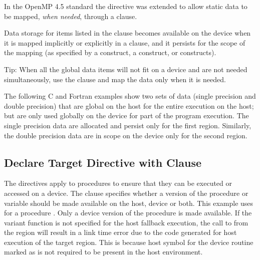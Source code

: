 
In the OpenMP 4.5 standard the  directive was extended to allow static
data to be mapped, \emph{when needed}, through a  clause.

Data storage for items listed in the  clause becomes available on the device
when it is mapped implicitly or explicitly in a  clause, and it persists for the scope of
the mapping (as specified by a  construct, 
a  construct, or 
 constructs).

Tip: When all the global data items will not fit on a device and are not needed
simultaneously, use the  clause and map the data only when it is needed.

The following C and Fortran examples show two sets of data (single precision and double precision)
that are global on the host for the entire execution on the host; but are only used
globally on the device for part of the program execution. The single precision data
are allocated and persist only for the first  region. Similarly, the
double precision data are in scope on the device only for the second  region.



\subsection{Declare Target Directive with  Clause}
\label{subsec:declare_target_device_type}




The  directives apply to procedures to ensure that they can be executed or accessed on a device. 
The  clause specifies whether a version of the procedure or variable should be made available on the host, device or both. 
This example uses  for a procedure . Only a device version of the procedure  is made available. 
If the variant function  is not specified for the host fallback execution, the call to  from the  region will result in a link time error due to the code generated for host execution of the target region.
This is because host symbol for the device routine  marked as  is not required to be present in the host environment.


